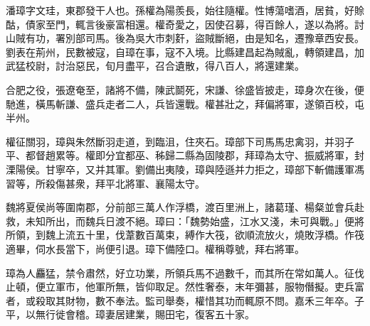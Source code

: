 
\begin{pinyinscope}
潘璋字文珪，東郡發干人也。孫權為陽羨長，始往隨權。性博蕩嗜酒，居貧，好賒酤，債家至門，輒言後豪富相還。權奇愛之，因使召募，得百餘人，遂以為將。討山賊有功，署別部司馬。後為吳大巿刺姧，盜賊斷絕，由是知名，遷豫章西安長。劉表在荊州，民數被寇，自璋在事，寇不入境。比縣建昌起為賊亂，轉領建昌，加武猛校尉，討治惡民，旬月盡平，召合遺散，得八百人，將還建業。

合肥之役，張遼奄至，諸將不備，陳武鬬死，宋謙、徐盛皆披走，璋身次在後，便馳進，橫馬斬謙、盛兵走者二人，兵皆還戰。權甚壯之，拜偏將軍，遂領百校，屯半州。

權征關羽，璋與朱然斷羽走道，到臨沮，住夾石。璋部下司馬馬忠禽羽，并羽子平、都督趙累等。權即分宜都巫、秭歸二縣為固陵郡，拜璋為太守、振威將軍，封溧陽侯。甘寧卒，又并其軍。劉備出夷陵，璋與陸遜并力拒之，璋部下斬備護軍馮習等，所殺傷甚衆，拜平北將軍、襄陽太守。

魏將夏侯尚等圍南郡，分前部三萬人作浮橋，渡百里洲上，諸葛瑾、楊粲並會兵赴救，未知所出，而魏兵日渡不絕。璋曰：「魏勢始盛，江水又淺，未可與戰。」便將所領，到魏上流五十里，伐葦數百萬束，縛作大筏，欲順流放火，燒敗浮橋。作筏適畢，伺水長當下，尚便引退。璋下備陸口。權稱尊號，拜右將軍。

璋為人麤猛，禁令肅然，好立功業，所領兵馬不過數千，而其所在常如萬人。征伐止頓，便立軍巿，他軍所無，皆仰取足。然性奢泰，末年彌甚，服物僭擬。吏兵富者，或殺取其財物，數不奉法。監司舉奏，權惜其功而輒原不問。嘉禾三年卒。子平，以無行徙會稽。璋妻居建業，賜田宅，復客五十家。


\end{pinyinscope}